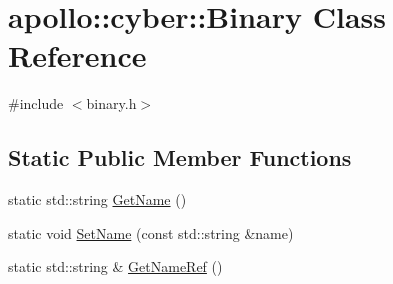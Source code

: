 \hypertarget{classapollo_1_1cyber_1_1Binary}{\section{apollo\-:\-:cyber\-:\-:Binary Class Reference}
\label{classapollo_1_1cyber_1_1Binary}
}


{\ttfamily \#include $<$binary.\-h$>$}

\subsection*{Static Public Member Functions}
\begin{DoxyCompactItemize}
\item 
static std\-::string \hyperlink{classapollo_1_1cyber_1_1Binary_a50d15e631b94618a48cb83daaadf6478}{Get\-Name} ()
\item 
static void \hyperlink{classapollo_1_1cyber_1_1Binary_accd64c51625d29c9b7e9ccf278c3f240}{Set\-Name} (const std\-::string \&name)
\item 
static std\-::string \& \hyperlink{classapollo_1_1cyber_1_1Binary_a9a9f2b85e6053472381643f347c7cd67}{Get\-Name\-Ref} ()
\end{DoxyCompactItemize}


